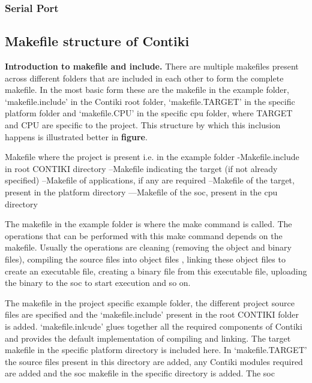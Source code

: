 \subsubsection{Serial Port}

\subsection{Makefile structure of Contiki}

\textbf{Introduction to makefile and include.}
There are multiple makefiles present across different folders that are included in each other to form the complete makefile. In the most basic form these are the makefile in the example folder, `makefile.include' in the Contiki root folder, `makefile.TARGET' in the specific platform folder and `makefile.CPU' in the specific cpu folder, where TARGET and CPU are specific to the project. This structure by which this inclusion happens is illustrated better in \textbf{figure}.

Makefile where the project is present i.e. in the example folder
-Makefile.include in root CONTIKI directory
--Makefile indicating the target (if not already specified)
--Makefile of applications, if any are required
--Makefile of the target, present in the platform directory
---Makefile of the \gls{soc}, present in the cpu directory

The makefile in the example folder is where the make command is called. The operations that can be performed with this make command depends on the makefile. Usually the operations are cleaning (removing the object and binary files), compiling the source files into object files , linking these object files to create an executable file, creating a binary file from this executable file, uploading the binary to the \gls{soc} to start execution and so on. 

The makefile in the project specific example folder, the different project source files are specified and the `makefile.include' present in the root CONTIKI folder is added. `makefile.inlcude' glues together all the required components of Contiki and provides the default implementation of compiling and linking. The target makefile in the specific platform directory is included here. In `makefile.TARGET' the source files present in this directory are added, any Contiki modules required are added and the \gls{soc} makefile in the specific directory is added. The \gls{soc} 



